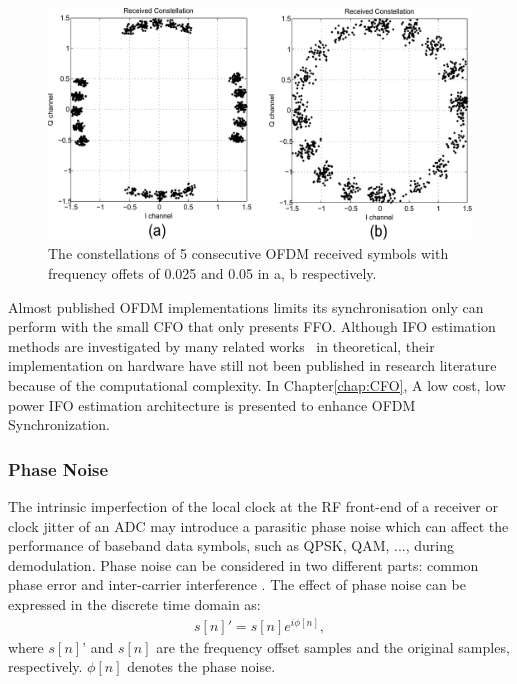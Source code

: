 \begin{figure}
	\centerline{\includegraphics [width=0.8\columnwidth] {Figures/freoff_5sym.pdf} }
	\caption{The constellations of 5 consecutive OFDM received symbols with frequency offets of 0.025 and 0.05 in a, b respectively.}
	\label{fig:freoff_5sym}
\end{figure}

Almost published OFDM implementations limits its synchronisation only can perform with the small CFO that only presents FFO.
Although IFO estimation methods are investigated by many related works~\cite{Shim2006,Morelli2008,You2010,Lee2013,Morelli2014} in theoretical, their implementation on hardware have still not been published in research literature because of the computational complexity. In Chapter\ref{chap:CFO}, A low cost, low power IFO estimation architecture is presented to enhance OFDM Synchronization. 

\subsubsection{Phase Noise}

The intrinsic imperfection of the local clock at the RF front-end of a receiver or clock jitter of an ADC may introduce a parasitic phase noise which can affect the performance of baseband data symbols, such as QPSK, QAM, ..., during demodulation.
Phase noise can be considered in two different parts: common phase error and inter-carrier interference \cite{Armada1998}. The effect of phase noise can be expressed in the discrete time domain as:
\begin{eqnarray}
\label{equ:}
            s[n]' = s[n] e^{i\phi[n]},
\end{eqnarray}	
where $s[n]’$ and $s[n]$ are the frequency offset samples and the original samples, respectively.
$\phi[n]$ denotes the phase noise.

